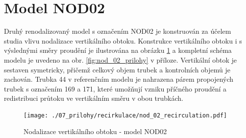  \section{Model NOD02}
 \label{sec:nod_02}
 Druhý renodalizovaný model s označením NOD02 je konstruován za účelem studia vlivu nodalizace vertikálního obtoku. Konstrukce vertikálního obtoku i s výslednými směry proudění je ilustrována na obrázku \ref{fig:nod_02} a kompletní schéma modelu je uvedeno na obr. \ref{fig:nod_02_prilohy} v příloze. Vertikální obtok je sestaven symetricky, přičemž celkový objem trubek a kontrolních objemů je zachován. Trubka 44 v referenčním modelu je nahrazena párem propojených trubek s označením 169 a 171, které umožňují vzniku příčného proudění a redistribuci průtoku ve vertikálním směru v obou trubkách.
 \begin{figure}[h]
 	\centering
 	\texttt{[image: ./07\_prilohy/recirkulace/nod\_02\_recirculation.pdf]}
 	\caption{Nodalizace vertikálního obtoku - model NOD02}
 	\label{fig:nod_02}
 \end{figure}
